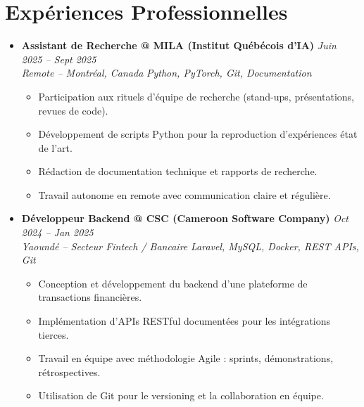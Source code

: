 \documentclass[a4paper,11pt]{article}
\begin{document}
\section{Expériences Professionnelles}
\begin{itemize}[leftmargin=*, label={-}]

\item \textbf{Assistant de Recherche @ MILA (Institut Québécois d'IA)} \hfill \textit{Juin 2025 -- Sept 2025} \\
\textit{Remote -- Montréal, Canada} \hfill \textit{Python, PyTorch, Git, Documentation}
\vspace{-2pt}
    \begin{itemize}[leftmargin=0.4cm, nosep, label=\tiny$\bullet$]
        \item \small{Participation aux rituels d'équipe de recherche (stand-ups, présentations, revues de code).}
        \item \small{Développement de scripts Python pour la reproduction d'expériences état de l'art.}
        \item \small{Rédaction de documentation technique et rapports de recherche.}
        \item \small{Travail autonome en remote avec communication claire et régulière.}
    \end{itemize}
\vspace{3pt}

\item \textbf{Développeur Backend @ CSC (Cameroon Software Company)} \hfill \textit{Oct 2024 -- Jan 2025} \\
\textit{Yaoundé -- Secteur Fintech / Bancaire} \hfill \textit{Laravel, MySQL, Docker, REST APIs, Git}
\vspace{-2pt}
    \begin{itemize}[leftmargin=0.4cm, nosep, label=\tiny$\bullet$]
        \item \small{Conception et développement du backend d'une plateforme de transactions financières.}
        \item \small{Implémentation d'APIs RESTful documentées pour les intégrations tierces.}
        \item \small{Travail en équipe avec méthodologie Agile : sprints, démonstrations, rétrospectives.}
        \item \small{Utilisation de Git pour le versioning et la collaboration en équipe.}
    \end{itemize}
\vspace{3pt}


\end{itemize}
\end{document}
